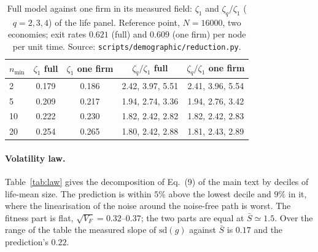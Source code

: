 \documentclass[pre,onecolumn,superscriptaddress,nofootinbib]{revtex4-2}
\newcommand{\Sb}{\bar S}
\begin{document}
\begin{table}[h]
\caption{Full model against one firm in its measured field: $\zeta_1$ and $\zeta_q/\zeta_1$ ($q=2,3,4$) of the
life panel.  Reference point, $N=16000$, two economies; exit rates $0.621$ (full) and $0.609$ (one
firm) per node per unit time.  Source: \texttt{scripts/demographic/reduction.py}.}
\label{tab:reduction}
\begin{ruledtabular}
\begin{tabular}{lcccc}
$n_{\min}$ & $\zeta_1$ full & $\zeta_1$ one firm & $\zeta_q/\zeta_1$ full & $\zeta_q/\zeta_1$ one firm\\
\hline
2  & 0.179 & 0.186 & 2.42, 3.97, 5.51 & 2.41, 3.96, 5.54\\
5  & 0.209 & 0.217 & 1.94, 2.74, 3.36 & 1.94, 2.76, 3.42\\
10 & 0.222 & 0.230 & 1.82, 2.42, 2.82 & 1.82, 2.42, 2.83\\
20 & 0.254 & 0.265 & 1.80, 2.42, 2.88 & 1.81, 2.43, 2.89\\
\end{tabular}
\end{ruledtabular}
\end{table}

\paragraph{Volatility law.}  Table~\ref{tab:law} gives the decomposition of Eq.~(9) of the main text by
deciles of life-mean size.  The prediction is within $5\%$ above the lowest decile and $9\%$ in it,
where the linearisation of the noise around the noise-free path is worst.  The fitness part is flat,
$\sqrt{V_F}=0.32$--$0.37$; the two parts are equal at $\Sb\simeq1.5$.  Over the range of the table the
measured slope of $\mathrm{sd}(g)$ against $\Sb$ is $0.17$ and the prediction's $0.22$.
\end{document}
